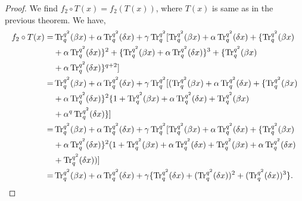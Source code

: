 \documentclass{birkjour}
\theoremstyle{definition}
\theoremstyle{remark}
\numberwithin{equation}{section}
\begin{document}
	\begin{proof} We find $f_2\circ T(x)=f_2(T(x))$, where $T(x)$ is same as in the previous theorem. We have,
	\begin{align}
		f_2\circ T(x)=&\operatorname{Tr}_{q}^{q^2}(\beta x)+\alpha\operatorname{Tr}_{q}^{q^2}(\delta x)+\gamma\operatorname{Tr}_{q}^{q^2}[\operatorname{Tr}_{q}^{q^2}(\beta x)+\alpha\operatorname{Tr}_{q}^{q^2}(\delta x)+\{\operatorname{Tr}_{q}^{q^2}(\beta x)\notag\\&+\alpha\operatorname{Tr}_{q}^{q^2}(\delta x)\}^2+\{\operatorname{Tr}_{q}^{q^2}(\beta x)+\alpha\operatorname{Tr}_{q}^{q^2}(\delta x)\}^3+\{\operatorname{Tr}_{q}^{q^2}(\beta x)\notag\\&+\alpha\operatorname{Tr}_{q}^{q^2}(\delta x)\}^{q+2}]\notag\\
		=&\operatorname{Tr}_{q}^{q^2}(\beta x)+\alpha\operatorname{Tr}_{q}^{q^2}(\delta x)+\gamma\operatorname{Tr}_{q}^{q^2}[(\operatorname{Tr}_{q}^{q^2}(\beta x)+\alpha\operatorname{Tr}_{q}^{q^2}(\delta x)+\{\operatorname{Tr}_{q}^{q^2}(\beta x)\notag\\&+\alpha\operatorname{Tr}_{q}^{q^2}(\delta x)\}^2\{1+\operatorname{Tr}_{q}^{q^2}(\beta x)+\alpha\operatorname{Tr}_{q}^{q^2}(\delta x)+\operatorname{Tr}_{q}^{q^2}(\beta x)\notag\\&+\alpha^{q}\operatorname{Tr}_{q}^{q^2}(\delta x)\}]\notag\\
		=&\operatorname{Tr}_{q}^{q^2}(\beta x)+\alpha\operatorname{Tr}_{q}^{q^2}(\delta x)+\gamma\operatorname{Tr}_{q}^{q^2}[\operatorname{Tr}_{q}^{q^2}(\beta x)+\alpha\operatorname{Tr}_{q}^{q^2}(\delta x)+\{\operatorname{Tr}_{q}^{q^2}(\beta x)\notag\\&+\alpha\operatorname{Tr}_{q}^{q^2}(\delta x)\}^2(1+\operatorname{Tr}_{q}^{q^2}(\beta x)+\alpha\operatorname{Tr}_{q}^{q^2}(\delta x)+\operatorname{Tr}_{q}^{q^2}(\beta x)+\alpha\operatorname{Tr}_{q}^{q^2}(\delta x)\notag\\&+\operatorname{Tr}_{q}^{q^2}(\delta x))]\notag\\
		=&\operatorname{Tr}_{q}^{q^2}(\beta x)+\alpha\operatorname{Tr}_{q}^{q^2}(\delta x)+\gamma\{\operatorname{Tr}_{q}^{q^2}(\delta x)+(\operatorname{Tr}_{q}^{q^2}(\delta x))^2+(\operatorname{Tr}_{q}^{q^2}(\delta x))^3\}.\label{2a}
		\end{align}
	

\end{proof}
\end{document}
